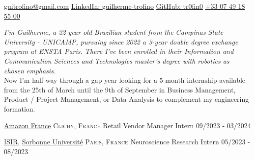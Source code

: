 \documentclass[8pt, a4paper]{article}
\begin{document}
 

\bull\href{mailto:guitrofino@gmail.com}{guitrofino@gmail.com}                           %
\bull\href{https://www.linkedin.com/in/guilherme-trofino/}{LinkedIn: guilherme-trofino} %
\bull\href{https://github.com/tr0fin0}{GitHub: tr0fin0}                                 %
\bull\href{tel:+330749185500}{+33 07 49 18 55 00}                                       %

\spacedhrule{0.9em}{-0.4em}


\begin{multicols}{2}
\noindent \textit{I'm Guilherme, a 22-year-old Brazilian student from the Campinas State University - UNICAMP, pursuing since 2022 a 3-year double degree exchange program at ENSTA Paris. There I've been enrolled in their Information and Communication Sciences and Technologies master's degree with robotics as chosen emphasis.}\\
\noindent Now I'm half-way through a gap year looking for a 5-month internship available from the 25th of March until the 9th of September in Business Management, Product / Project Management, or Data Analysis to complement my engineering formation.
\end{multicols}

\spacedhrule{0.5em}{-0.4em}


\headedsection
    {\href{https://www.aboutamazon.fr/}{Amazon France}}
    {\textsc{Clichy, France}}
    {
        \headedsubsection
        {Retail Vendor Manager Intern}
        {09/2023 - 03/2024}
        {}
    }

\headedsection
    {\href{https://www.isir.upmc.fr/?lang=en}{ISIR}, \href{https://www.sorbonne-universite.fr/}{Sorbonne Université}}
    {\textsc{Paris, France}}
    {
        \headedsubsection
        {Neuroscience Research Intern}
        {05/2023 - 08/2023}
        {}
    }
\end{document}

